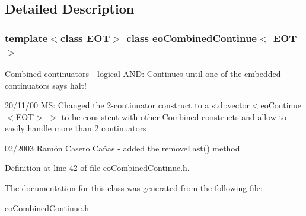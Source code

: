 \subsection{Detailed Description}
\subsubsection*{template$<$class EOT$>$ class eo\-Combined\-Continue$<$ EOT $>$}

Combined continuators - logical AND: Continues until one of the embedded continuators says halt! 

20/11/00 MS: Changed the 2-continuator construct to a std::vector$<$eo\-Continue$<$EOT$>$ $>$ to be consistent with other Combined constructs and allow to easily handle more than 2 continuators

02/2003 Ram\'{o}n Casero Ca\~{n}as - added the remove\-Last() method 



Definition at line 42 of file eo\-Combined\-Continue.h.

The documentation for this class was generated from the following file:\begin{CompactItemize}
\item 
eo\-Combined\-Continue.h\end{CompactItemize}
